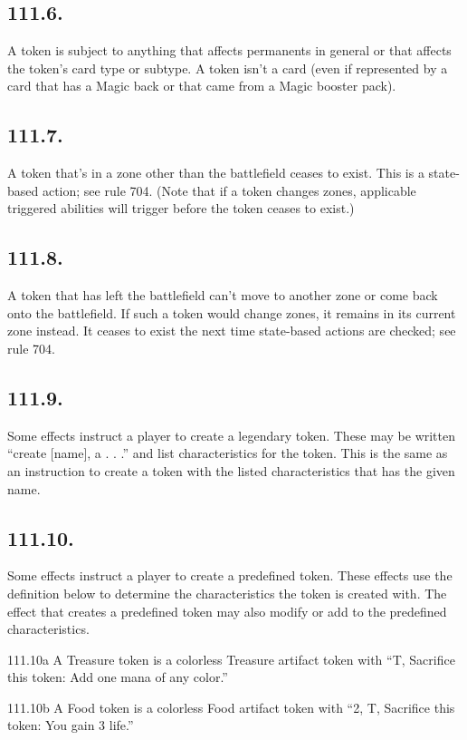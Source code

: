 \subsection*{111.6.}
A token is subject to anything that affects permanents in general or that affects the token’s card type or subtype. A token isn’t a card (even if represented by a card that has a Magic back or that came from a Magic booster pack).

\subsection*{111.7.}
A token that’s in a zone other than the battlefield ceases to exist. This is a state-based action; see rule 704. (Note that if a token changes zones, applicable triggered abilities will trigger before the token ceases to exist.)

\subsection*{111.8.}
A token that has left the battlefield can’t move to another zone or come back onto the battlefield. If such a token would change zones, it remains in its current zone instead. It ceases to exist the next time state-based actions are checked; see rule 704.

\subsection*{111.9.}
Some effects instruct a player to create a legendary token. These may be written “create [name], a . . .” and list characteristics for the token. This is the same as an instruction to create a token with the listed characteristics that has the given name.

\subsection*{111.10.}
Some effects instruct a player to create a predefined token. These effects use the definition below to determine the characteristics the token is created with. The effect that creates a predefined token may also modify or add to the predefined characteristics.

111.10a A Treasure token is a colorless Treasure artifact token with “{T}, Sacrifice this token: Add one mana of any color.”

111.10b A Food token is a colorless Food artifact token with “{2}, {T}, Sacrifice this token: You gain 3 life.”


